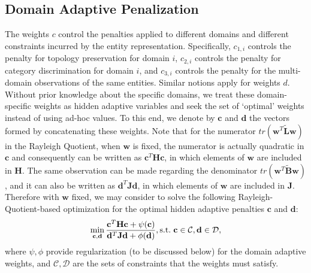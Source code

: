 \documentclass[10pt,twocolumn,letterpaper]{article}
\begin{document}
\subsection{Domain Adaptive Penalization}


The weights $c$ control the penalties applied to different domains and different constraints incurred by the entity representation. Specifically, $c_{1,i}$ controls the penalty for topology preservation for domain $i$, $c_{2,i}$ controls the penalty for category discrimination for domain $i$, and $c_{3,i}$ controls the penalty for the multi-domain observations of the same entities. Similar notions apply for weights $d$. Without prior knowledge about the specific domains, we treat these domain-specific weights as hidden adaptive variables and seek the set of `optimal'  weights instead of using ad-hoc values. To this end, we denote by $\mathbf{c}$ and $\mathbf{d}$ the vectors formed by concatenating these weights. Note that for the numerator $tr(\mathbf{w}^{T}\tilde{\mathbf{L}}\mathbf{w})$ in the Rayleigh Quotient, when $\mathbf{w}$ is fixed, the numerator is actually quadratic in $\mathbf{c}$ and consequently can be written as $\mathbf{c}^{T}\mathbf{H}\mathbf{c}$, in which elements of $\mathbf{w}$ are included in $\mathbf{H}$. The same observation can be made regarding the denominator $tr(\mathbf{w}^{T}\tilde{\mathbf{B}}\mathbf{w})$, and it can also be written as $\mathbf{d}^{T}\mathbf{J}\mathbf{d}$, in which elements of $\mathbf{w}$ are included in $\mathbf{J}$. Therefore with $\mathbf{w}$ fixed, we may consider to solve the following Rayleigh-Quotient-based optimization for the optimal hidden adaptive penalties $\mathbf{c}$ and $\mathbf{d}$:
\begin{equation}
\label{obj}
\min_{\mathbf{c},\mathbf{d}}\frac{\mathbf{c}^{T}\mathbf{H}\mathbf{c}+\psi(\mathbf{c})}{\mathbf{d}^{T}\mathbf{J}\mathbf{d}+\phi(\mathbf{d})}, \textup{s.t.}\hspace{3pt}\mathbf{c}\in\mathcal{C}, \mathbf{d}\in\mathcal{D}, 
\end{equation}
where $\psi, \phi$ provide regularization (to be discussed below) for the domain adaptive weights, and $\mathcal{C},\mathcal{D}$ are the sets of constraints that the weights must satisfy.
\end{document}
